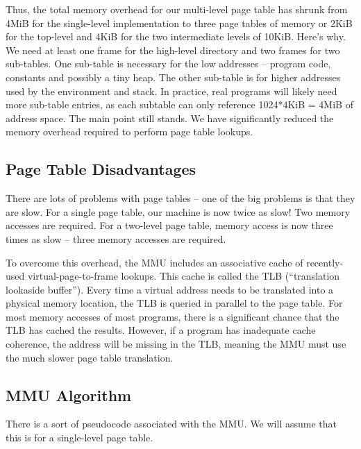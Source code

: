 	Thus, the total memory overhead for our multi-level page table has shrunk from 4MiB for the single-level implementation to three page tables of memory or 2KiB for the top-level and 4KiB for the two intermediate levels of 10KiB.
	Here's why.
	We need at least one frame for the high-level directory and two frames for two sub-tables.
	One sub-table is necessary for the low addresses -- program code, constants and possibly a tiny heap.
	The other sub-table is for higher addresses used by the environment and stack.
	In practice, real programs will likely need more sub-table entries, as each subtable can only reference 1024*4KiB = 4MiB of address space.
	The main point still stands.
	We have significantly reduced the memory overhead required to perform page table lookups.
	 
	\subsection{Page Table Disadvantages}
	 
	There are lots of problems with page tables -- one of the big problems is that they are slow.
	For a single page table, our machine is now twice as slow!
	Two memory accesses are required.
	For a two-level page table, memory access is now three times as slow -- three memory accesses are required.
	 
	To overcome this overhead, the MMU includes an associative cache of recently-used virtual-page-to-frame lookups.
	This cache is called the TLB (``translation lookaside buffer'').
	Every time a virtual address needs to be translated into a physical memory location, the TLB is queried in parallel to the page table.
	For most memory accesses of most programs, there is a significant chance that the TLB has cached the results.
	However, if a program has inadequate cache coherence, the address will be missing in the TLB, meaning the MMU must use the much slower page table translation.
	 
	\subsection{MMU Algorithm}
	 
	There is a sort of pseudocode associated with the MMU.
	We will assume that this is for a single-level page table.
	 
